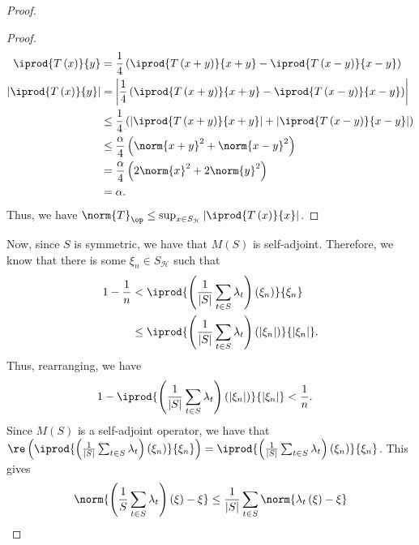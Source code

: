 \documentclass[10pt]{mypackage}
\begin{document}
\begin{proof}
\begin{proof}
    \begin{align*}
      \iprod{T\left(x\right)}{y} &= \frac{1}{4}\left( \iprod{T\left(x+y\right)}{x+y} - \iprod{T\left(x-y\right)}{x-y}\right)\\
      \left\vert \iprod{T\left(x\right)}{y} \right\vert &= \left\vert \frac{1}{4}\left( \iprod{T\left(x+y\right)}{x+y} - \iprod{T\left(x-y\right)}{x-y}\right) \right\vert\\
                                                        &\leq \frac{1}{4}\left( \left\vert \iprod{T\left(x+y\right)}{x+y} \right\vert + \left\vert \iprod{T\left(x-y\right)}{x-y} \right\vert\right)\\
                                                        &\leq \frac{\alpha}{4} \left(\norm{x+y}^2 + \norm{x-y}^2\right)\\
                                                        &= \frac{\alpha}{4}\left(2\norm{x}^2 + 2\norm{y}^2\right)\\
                                                        &= \alpha.
    \end{align*}
    Thus, we have $\norm{T}_{\op}\leq \sup_{x\in S_{\mathcal{H}}} \left\vert \iprod{T\left(x\right)}{x} \right\vert$.
  \end{proof}
  Now, since $S$ is symmetric, we have that $M(S)$ is self-adjoint. Therefore, we know that there is some $\xi_n\in S_{\mathcal{H}}$ such that
  \begin{align*}
    1-\frac{1}{n} &< \iprod{\left(\frac{1}{\left\vert S \right\vert}\sum_{t\in S}\lambda_t\right)\left(\xi_n\right)}{\xi_n}\\
                  &\leq \iprod{\left(\frac{1}{\left\vert S \right\vert}\sum_{t\in S}\lambda_t\right)\left(\left\vert \xi_n \right\vert\right)}{\left\vert \xi_n \right\vert}.
  \end{align*}
  Thus, rearranging, we have
  \begin{align*}
    1 - \iprod{\left(\frac{1}{\left\vert S \right\vert}\sum_{t\in S}\lambda_t\right)\left(\left\vert \xi_n \right\vert\right)}{\left\vert \xi_n \right\vert} &< \frac{1}{n}.
  \end{align*}
  Since $M(S)$ is a self-adjoint operator, we have that $\re\left( \iprod{\left( \frac{1}{\left\vert S \right\vert}\sum_{t\in S}\lambda_t \right)\left( \xi_n \right)}{\xi_n} \right) = \iprod{\left( \frac{1}{\left\vert S \right\vert}\sum_{t\in S}\lambda_t \right)\left( \xi_n \right)}{\xi_n}$. This gives
  \begin{align*}
    \norm{\left( \frac{1}{S}\sum_{t\in S}\lambda_t \right)\left( \xi \right) - \xi} &\leq \frac{1}{\left\vert S \right\vert}\sum_{t\in S}\norm{\lambda_t\left( \xi \right) - \xi}\\

\end{align*}
\end{proof}
\end{document}
